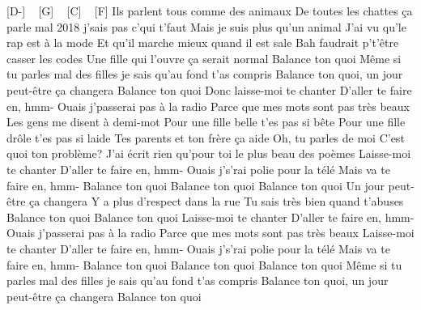 
[D-] ~ [G] ~ [C] ~ [F]
Ils parlent tous comme des animaux
De toutes les chattes ça parle mal
2018 j'sais pas c'qui t'faut
Mais je suis plus qu'un animal
J'ai vu qu'le rap est à la mode
Et qu'il marche mieux quand il est sale
Bah faudrait p't'être casser les codes
Une fille qui l'ouvre ça serait normal
Balance ton quoi
Même si tu parles mal des filles je sais qu'au fond t'as compris
Balance ton quoi, un jour peut-être ça changera
Balance ton quoi
Donc laisse-moi te chanter
D'aller te faire en, hmm-
Ouais j'passerai pas à la radio
Parce que mes mots sont pas très beaux
Les gens me disent à demi-mot
Pour une fille belle t'es pas si bête
Pour une fille drôle t'es pas si laide
Tes parents et ton frère ça aide
Oh, tu parles de moi
C'est quoi ton problème?
J'ai écrit rien qu'pour toi le plus beau des poèmes
Laisse-moi te chanter
D'aller te faire en, hmm-
Ouais j's'rai polie pour la télé
Mais va te faire en, hmm-
Balance ton quoi
Balance ton quoi
Balance ton quoi
Un jour peut-être ça changera
Y a plus d'respect dans la rue
Tu sais très bien quand t'abuses
Balance ton quoi
Balance ton quoi
Laisse-moi te chanter
D'aller te faire en, hmm-
Ouais j'passerai pas à la radio
Parce que mes mots sont pas très beaux
Laisse-moi te chanter
D'aller te faire en, hmm-
Ouais j's'rai polie pour la télé
Mais va te faire en, hmm-
Balance ton quoi
Balance ton quoi
Balance ton quoi
Même si tu parles mal des filles je sais qu'au fond t'as compris
Balance ton quoi, un jour peut-être ça changera
Balance ton quoi
